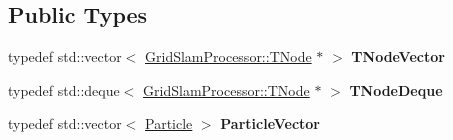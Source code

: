 \subsection*{Public Types}
\begin{DoxyCompactItemize}
\item 
\mbox{\label{classGMapping_1_1GridSlamProcessor_a5992af06fd86724fbdc9471b2780ab49}} 
typedef std\+::vector$<$ \hyperlink{structGMapping_1_1GridSlamProcessor_1_1TNode}{Grid\+Slam\+Processor\+::\+T\+Node} $\ast$ $>$ {\bfseries T\+Node\+Vector}
\item 
\mbox{\label{classGMapping_1_1GridSlamProcessor_a2c477fefb94357e8a6951e1e4786935e}} 
typedef std\+::deque$<$ \hyperlink{structGMapping_1_1GridSlamProcessor_1_1TNode}{Grid\+Slam\+Processor\+::\+T\+Node} $\ast$ $>$ {\bfseries T\+Node\+Deque}
\item 
\mbox{\label{classGMapping_1_1GridSlamProcessor_acce61eef3666984121227234e376b8df}} 
typedef std\+::vector$<$ \hyperlink{structGMapping_1_1GridSlamProcessor_1_1Particle}{Particle} $>$ {\bfseries Particle\+Vector}
\end{DoxyCompactItemize}
